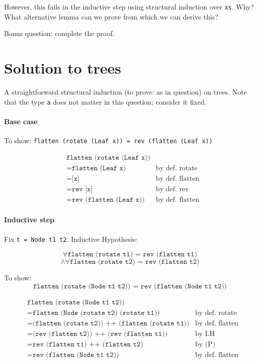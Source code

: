 \documentclass[10pt,a4paper]{article}
\newcommand{\just}[2]{\texttt{#1} & \textrm{#2}}
\begin{document}
However, this fails in the inductive step using structural induction over \texttt{xs}. Why?
What alternative lemma can we prove from which we can derive this?

Bonus question: complete the proof.


\newpage

\section{Solution to trees}
A straightforward structural induction (to prove: as in question) on trees.
Note that the type \texttt{a} does not matter in this question; consider it fixed.

\paragraph{Base case}
To show: \texttt{flatten (rotate (Leaf x)) = rev (flatten (Leaf x))}

\begin{align*}
& \texttt{flatten (rotate (Leaf x))} \\
&= \just{flatten (Leaf x)}{by def. rotate} \\
&= \just{[x]}{by def. flatten} \\
&= \just{rev [x]}{by def. rev} \\
&= \just{rev (flatten (Leaf x))}{by def. flatten}
\end{align*}

\paragraph{Inductive step}
Fix \texttt{t = Node t1 t2}.
Inductive Hypothesis:

\[ \forall \texttt{flatten (rotate t1) = rev (flatten t1)} \]
\[ \land \forall \texttt{flatten (rotate t2) = rev (flatten t2)} \]

To show:
\[ \texttt{flatten (rotate (Node t1 t2)) = rev (flatten (Node t1 t2))} \]

\begin{align*}
& \texttt{flatten (rotate (Node t1 t2))} \\
&= \just{flatten (Node (rotate t2) (rotate t1))}{by def. rotate} \\
&= \just{(flatten (rotate t2)) ++ (flatten (rotate t1))}{by def. flatten} \\
&= \just{(rev (flatten t2)) ++ (rev (flatten t1))}{by I.H} \\
&= \just{rev (flatten t1) ++ (flatten t2)}{by (P)} \\
&= \just{rev (flatten (Node t1 t2))}{by def. flatten}
\end{align*}
\end{document}
